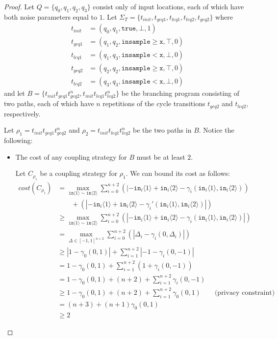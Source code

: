 \documentclass[12pt]{article}
\newcommand{\gguard}[1][x]{\texttt{insample}\geq#1}
\newcommand{\lguard}[1][x]{\texttt{insample} < #1}
\newcommand{\brangle}[1]{\langle#1 \rangle}
\theoremstyle{definition}
\begin{document}
\begin{proof}
    Let $Q = \{q_0, q_1, q_2, q_3\}$ consist only of input locations, each of which have both noise parameters equal to $1$. Let $\Sigma_T = \{t_{init}, t_{geq1}, t_{leq1}, t_{leq2}, t_{geq2}\}$ where 
    \begin{align*}
        t_{init} &= (q_0, q_1, \texttt{true}, \bot, 1)\\
        t_{geq1} &= (q_1, q_2, \gguard[\texttt{x}], \top, 0)\\
        t_{leq1} &= (q_1, q_3, \lguard[\texttt{x}], \bot, 0)\\
        t_{geq2} &= (q_2, q_2, \gguard[\texttt{x}], \top, 0)\\
        t_{leq2} &= (q_3, q_3, \lguard[\texttt{x}], \bot, 0)
    \end{align*}
    and let $B = \{t_{init}t_{geq1}t_{geq2}^n, t_{init}t_{leq1}t_{leq2}^n\}$ be the branching program consisting of two paths, each of which have $n$ repetitions of the cycle transitions $t_{geq2}$ and $t_{leq2}$, respectively.

    Let $\rho_1 = t_{init}t_{geq1}t_{geq2}^n$ and $\rho_2 = t_{init}t_{leq1}t_{leq2}^n$ be the two paths in $B$. Notice the following: 
    
    \begin{itemize}
        \item The cost of any coupling strategy for $B$ must be at least $2$.
        
        Let $C_{\rho_1}$ be a coupling strategy for $\rho_1$. We can bound its cost as follows: 
        \begin{align*}
            cost(C_{\rho_1}) &= \max_{\texttt{in}\brangle{1}\sim\texttt{in}\brangle{2}}\sum_{i=0}^{n+2}(|-\texttt{in}_i\brangle{1}+\texttt{in}_i\brangle{2}-\gamma_i(\texttt{in}_i\brangle{1}, \texttt{in}_i\brangle{2}))\\&\qquad+(|-\texttt{in}_i\brangle{1}+\texttt{in}_i\brangle{2}-\gamma_i'(\texttt{in}_i\brangle{1}, \texttt{in}_i\brangle{2})|)\\
            &\geq \max_{\texttt{in}\brangle{1}\sim\texttt{in}\brangle{2}} \sum_{i=0}^{n+2}(|-\texttt{in}_i\brangle{1}+\texttt{in}_i\brangle{2}-\gamma_i(\texttt{in}_i\brangle{1}, \texttt{in}_i\brangle{2})|)\\
            &= \max_{\Delta \in [-1, 1]^{n+2}} \sum_{i=0}^{n+2}(|\Delta_i-\gamma_i(0, \Delta_i)|)\\
            &\geq |1 - \gamma_0(0, 1)| + \sum_{i=1}^{n+2}|-1-\gamma_i(0, -1)|\\
            &= 1 - \gamma_0(0, 1) + \sum_{i=1}^{n+2} (1+\gamma_i(0, -1))\\
            &= 1 - \gamma_0(0, 1) + (n + 2) + \sum_{i=1}^{n+2}\gamma_i(0, -1)\\
            &\geq 1 - \gamma_0(0, 1) + (n + 2) + \sum_{i=1}^{n+2}\gamma_0(0, 1) \qquad \text{(privacy constraint)}\\
            &= (n + 3) + (n + 1) \gamma_0(0, 1)\\
            &\geq 2
        \end{align*}


\end{itemize}
\end{proof}
\end{document}
